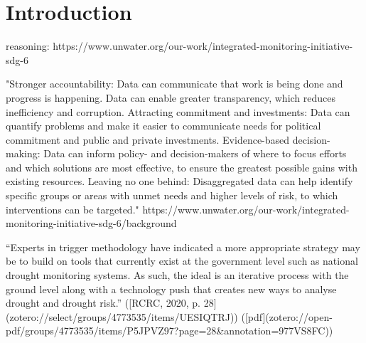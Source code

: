 
\chapter{Introduction} %

\label{Chapter1} %

\newcommand{\keyword}[1]{\textbf{#1}}
\newcommand{\tabhead}[1]{\textbf{#1}}
\newcommand{\code}[1]{\texttt{#1}}
\newcommand{\file}[1]{\texttt{\bfseries#1}}
\newcommand{\option}[1]{\texttt{\itshape#1}}


reasoning:
https://www.unwater.org/our-work/integrated-monitoring-initiative-sdg-6

"Stronger accountability: Data can communicate that work is being done and progress is happening. Data can enable greater transparency, which reduces inefficiency and corruption.
Attracting commitment and investments: Data can quantify problems and make it easier to communicate needs for political commitment and public and private investments.
Evidence-based decision-making: Data can inform policy- and decision-makers of where to focus efforts and which solutions are most effective, to ensure the greatest possible gains with existing resources.
Leaving no one behind: Disaggregated data can help identify specific groups or areas with unmet needs and higher levels of risk, to which interventions can be targeted."
https://www.unwater.org/our-work/integrated-monitoring-initiative-sdg-6/background

“Experts in trigger methodology have indicated a more appropriate strategy may be to build on tools that currently exist at the government level such as national drought monitoring systems. As such, the ideal is an iterative process with the ground level along with a technology push that creates new ways to analyse drought and drought risk.” ([RCRC, 2020, p. 28](zotero://select/groups/4773535/items/UESIQTRJ)) ([pdf](zotero://open-pdf/groups/4773535/items/P5JPVZ97?page=28&annotation=977VS8FC))

